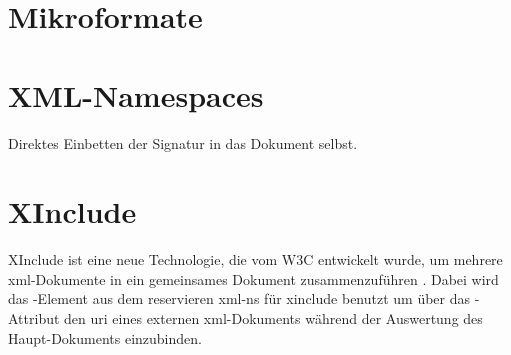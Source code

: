 

\section{Mikroformate}
\todo

\section{XML-Namespaces}
Direktes Einbetten der Signatur in das Dokument selbst.\todo



\section{XInclude}
XInclude ist eine neue Technologie, die vom W3C entwickelt wurde, um mehrere \gls{xml}-Dokumente in ein gemeinsames Dokument zusammenzuführen \cite{xml:oreilly}.
Dabei wird das -Element aus dem reservieren \gls{xml-ns} für \gls{xinclude} benutzt um über das -Attribut den \gls{uri}
eines externen \gls{xml}-Dokuments während der Auswertung des Haupt-Dokuments einzubinden. \todo



